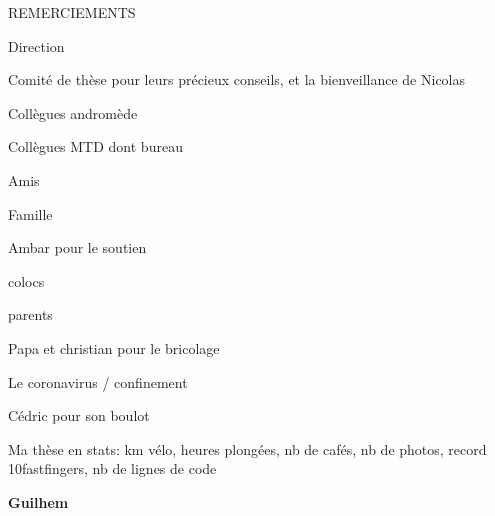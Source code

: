 
{}
{\centerline { {\sffamily \Large REMERCIEMENTS}}}

\vspace*{1cm}
\vskip 0.5cm
\noindent

Direction

Comité de thèse pour leurs précieux conseils, et la bienveillance de Nicolas

Collègues andromède

Collègues MTD dont bureau

Amis

Famille

Ambar pour le soutien

colocs

parents

Papa et christian pour le bricolage

Le coronavirus / confinement

Cédric pour son boulot

Ma thèse en stats: km vélo, heures plongées, nb de cafés, nb de photos, record 10fastfingers, nb de lignes de code


\vskip 0.3cm
\noindent
 \qquad  \qquad \qquad \qquad \qquad \qquad \qquad \qquad \quad \textbf{Guilhem}
